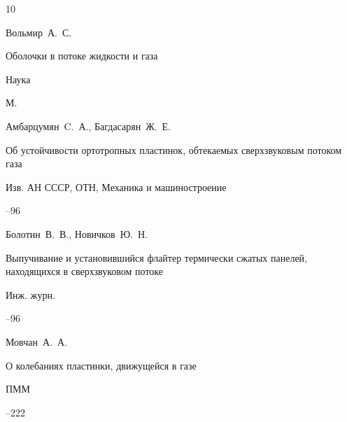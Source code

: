 


\begin{thebibliography}{10}




\by Вольмир~А.~С.

\book Оболочки в потоке жидкости и газа


\publ Наука

\publaddr М.





\by Амбарцумян~C.~А., Багдасарян~Ж.~Е.

\paper Об устойчивости ортотропных пластинок, обтекаемых сверхзвуковым потоком газа

\jour Изв. АН СССР, ОТН, Механика и машиностроение



--96




\by Болотин~В.~В., Новичков~Ю.~Н.

\paper Выпучивание и установившийся флайтер термически сжатых панелей, находящихся в сверхзвуковом потоке

\jour Инж. журн.



--96








\by Мовчан~А.~А.

\paper О колебаниях пластинки, движущейся в газе

\jour ПММ




--222







\end{thebibliography}
